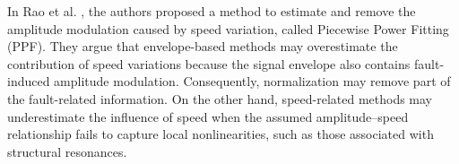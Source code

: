 
In Rao et al. \cite{RAO2024111751}, the authors proposed a method to estimate and remove the amplitude modulation caused by speed variation, called Piecewise Power Fitting (PPF). They argue that envelope-based methods may overestimate the contribution of speed variations because the signal envelope also contains fault-induced amplitude modulation. Consequently, normalization may remove part of the fault-related information. On the other hand, speed-related methods may underestimate the influence of speed when the assumed amplitude–speed relationship fails to capture local nonlinearities, such as those associated with structural resonances.


